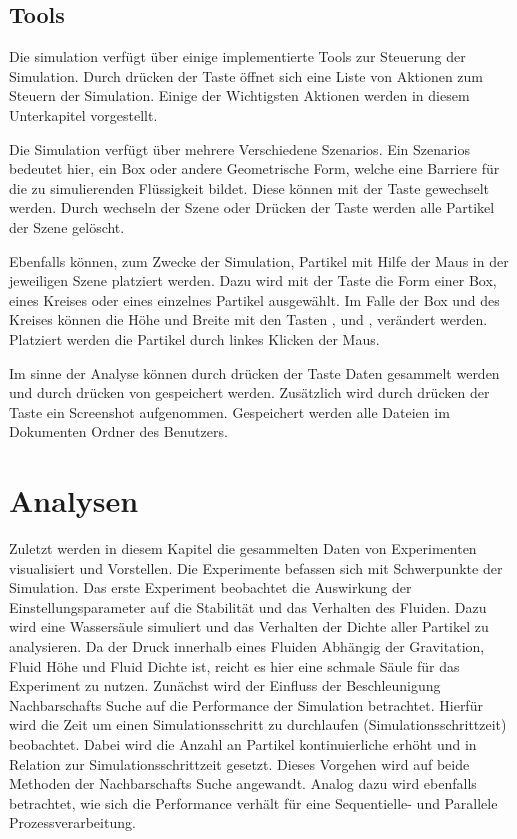 \documentclass[a4paper, 12pt]{article}
\begin{document}
\subsection{Tools}
Die simulation verfügt über einige implementierte Tools zur Steuerung der Simulation. Durch drücken der Taste  öffnet sich eine Liste von Aktionen zum Steuern der Simulation. Einige der Wichtigsten Aktionen werden in diesem Unterkapitel vorgestellt. 

Die Simulation verfügt über mehrere Verschiedene \glqq Szenarios\grqq{}. Ein \glqq Szenarios\grqq{} bedeutet hier, ein Box oder andere Geometrische Form, welche eine Barriere für die zu simulierenden Flüssigkeit bildet. Diese können mit der Taste  gewechselt werden. Durch wechseln der Szene oder Drücken der Taste  werden alle Partikel der Szene gelöscht. 

Ebenfalls können, zum Zwecke der Simulation, Partikel mit Hilfe der Maus in der jeweiligen Szene platziert werden. Dazu wird mit der Taste  die Form einer Box, eines Kreises oder eines einzelnes Partikel
ausgewählt. Im Falle der Box und des Kreises können die Höhe und Breite mit den Tasten ,  und ,  verändert werden. Platziert werden die Partikel durch linkes Klicken der Maus.

Im sinne der Analyse können durch drücken der Taste  Daten gesammelt werden und durch drücken von  gespeichert werden. Zusätzlich wird durch drücken der Taste  ein Screenshot aufgenommen. Gespeichert werden alle Dateien im Dokumenten Ordner des Benutzers.

\section{Analysen} \label{section_6}
Zuletzt werden in diesem Kapitel die gesammelten Daten von Experimenten visualisiert und Vorstellen. Die Experimente befassen sich mit Schwerpunkte der Simulation. Das erste Experiment beobachtet die Auswirkung der Einstellungsparameter auf die Stabilität und das Verhalten des Fluiden. Dazu wird eine Wassersäule simuliert und das Verhalten der Dichte aller Partikel zu analysieren. Da der Druck innerhalb eines Fluiden Abhängig der Gravitation, Fluid Höhe und Fluid Dichte ist, reicht es hier eine schmale Säule für das Experiment zu nutzen. 
Zunächst wird der Einfluss der Beschleunigung Nachbarschafts Suche auf die Performance der Simulation betrachtet. Hierfür wird die Zeit um einen Simulationsschritt zu durchlaufen (Simulationsschrittzeit) beobachtet. Dabei wird die Anzahl an Partikel kontinuierliche erhöht und in Relation zur Simulationsschrittzeit gesetzt. Dieses Vorgehen wird auf beide Methoden der Nachbarschafts Suche angewandt.
Analog dazu wird ebenfalls betrachtet, wie sich die Performance verhält für eine Sequentielle- und Parallele Prozessverarbeitung.
\end{document}
